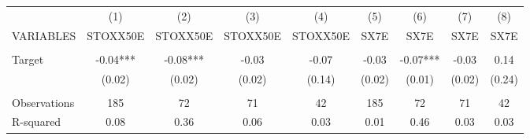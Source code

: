 \begin{tabular}{lcccccccc} \hline
 & (1) & (2) & (3) & (4) & (5) & (6) & (7) & (8) \\
VARIABLES & STOXX50E & STOXX50E & STOXX50E & STOXX50E & SX7E & SX7E & SX7E & SX7E \\ \hline
 &  &  &  &  &  &  &  &  \\
Target & -0.04*** & -0.08*** & -0.03 & -0.07 & -0.03 & -0.07*** & -0.03 & 0.14 \\
 & (0.02) & (0.02) & (0.02) & (0.14) & (0.02) & (0.01) & (0.02) & (0.24) \\
 &  &  &  &  &  &  &  &  \\
Observations & 185 & 72 & 71 & 42 & 185 & 72 & 71 & 42 \\
 R-squared & 0.08 & 0.36 & 0.06 & 0.03 & 0.01 & 0.46 & 0.03 & 0.03 \\ \hline
\end{tabular}
